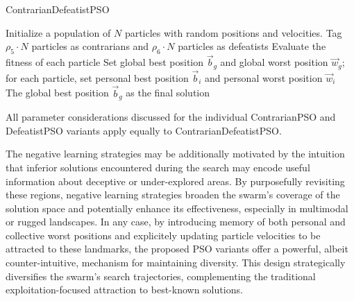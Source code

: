 {%
\begin{algorithm}[H]
\caption{ContrarianDefeatistPSO}\label{alg:contrariandefeatist}
Initialize a population of \(N\) particles with random positions and velocities. Tag \(\rho_5 \cdot N\) particles as contrarians and \(\rho_6 \cdot N\) particles as defeatists\;
Evaluate the fitness of each particle\;
Set global best position \(\vec{b}_g\) and global worst position \(\vec{w}_g\); for each particle, set personal best position \(\vec{b}_i\) and personal worst position \(\vec{w}_i\)\;
\Return The global best position \(\vec{b}_g\) as the final solution\;
\end{algorithm}

All parameter considerations discussed for the individual ContrarianPSO and DefeatistPSO variants apply equally to ContrarianDefeatistPSO.

The negative learning strategies may be additionally motivated by the intuition that inferior solutions encountered during the search may encode useful information about deceptive or under-explored areas. By purposefully revisiting these regions, negative learning strategies broaden the swarm’s coverage of the solution space and potentially enhance its effectiveness, especially in multimodal or rugged landscapes.
In any case, by introducing memory of both personal and collective worst positions and explicitely updating particle velocities to be attracted to these landmarks, the proposed PSO variants offer a powerful, albeit counter-intuitive, mechanism for maintaining diversity. This design strategically diversifies the swarm's search trajectories, complementing the traditional exploitation-focused attraction to best-known solutions.























}
